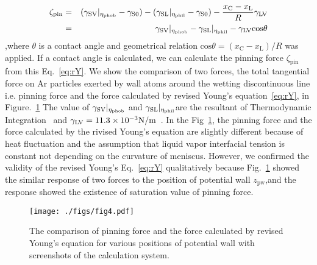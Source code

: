 \begin{eqnarray}
\zeta_{\text{pin}}
&=&(\gsv|_{\eta_{\text{phob}}}-\gs0)-(\gsl|_{\eta_{\text{phil}}}-\gs0)-\frac{x_{\text{C}}-x_{\text{L}}}{R}\glv \\
&=&\gsv|_{\eta_{\text{phob}}}-\gsl|_{\eta_{\text{phil}}}-\glv \text{cos}\theta
\label{eq:rY}
\end{eqnarray}
,where $\theta$ is a contact angle and geometrical relation $\text{cos}\theta=(x_{\text{C}}-x_{\text{L}})/R$ was applied.
If a contact angle is calculated, we can calculate the pinning force $\zeta_{\text{pin}}$ from this Eq.~\eqref{eq:rY}.
We show the comparison of two forces,
the total tangential force on Ar particles exerted by wall atoms around the wetting discontinuous line i.e. pinning force
and the force calculated by revised Young's equation~\eqref{eq:rY}, in Figure.~\ref{fig:clpinning} 
The value of $\gamma_\mathrm{SV}|_{\eta_{\text{phob}}}$ and $\gamma_\mathrm{SL}|_{\eta_{\text{phil}}}$are the resultant of Thermodynamic Integration~\cite{Yamaguchi2019}
and $\gamma_\mathrm{LV}=11.3\times 10^{-3}\text{N/m}$~\cite{Nishida14}.
In the Fig~\ref{fig:clpinning}, the pinning force and the force calculated by the rivised Young's equation are
slightly different because of heat fluctuation and the assumption that liquid vapor interfacial tension is constant not depending on the curvature of meniscus.
However, we confirmed the validity of the revised Young's Eq.~\eqref{eq:rY} qualitatively 
because Fig.~\ref{fig:clpinning} showed the similar response of two forces to the position of potential wall $z_{\text{pw}}$,and
the response showed the existence of saturation value of pinning force.
\begin{figure}
  \begin{center}
    \texttt{[image: ./figs/fig4.pdf]}
  \end{center} 
  \caption{\label{fig:clpinning}
    The comparison of pinning force and the force calculated by revised Young's equation for various positions of potential wall
with screenshots of the calculation system.
  }
\end{figure}

